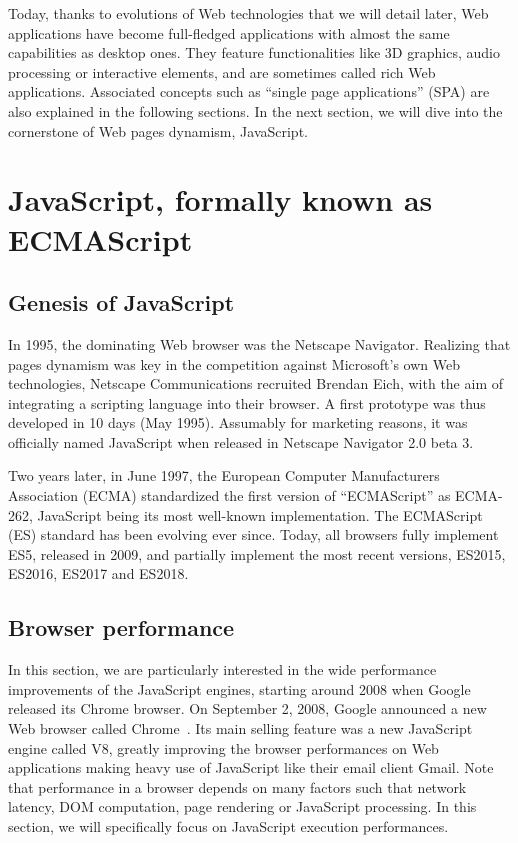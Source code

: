Today, thanks to evolutions of Web technologies that we will detail later,
Web applications have become full-fledged applications with almost
the same capabilities as desktop ones.
They feature functionalities like 3D graphics, audio processing or interactive elements,
and are sometimes called rich Web applications.
Associated concepts such as ``single page applications'' (SPA)
are also explained in the following sections.
In the next section, we will dive into the cornerstone of Web pages dynamism, JavaScript.


\section{JavaScript, formally known as ECMAScript}%
\label{sec:javascript_formally_known_as_ecmascript}

\subsection{Genesis of JavaScript}%
\label{sub:genesis_of_javascript}

In 1995, the dominating Web browser was the Netscape Navigator.
Realizing that pages dynamism was key in the competition against Microsoft's
own Web technologies, Netscape Communications recruited Brendan Eich,
with the aim of integrating a scripting language into their browser.
A first prototype was thus developed in 10 days (May 1995).
Assumably for marketing reasons, it was officially named JavaScript
when released in Netscape Navigator 2.0 beta 3.

Two years later, in June 1997, the European Computer Manufacturers Association
(ECMA) standardized the first version of ``ECMAScript'' as ECMA-262,
JavaScript being its most well-known implementation.
The ECMAScript (ES) standard has been evolving ever since.
Today, all browsers fully implement ES5, released in 2009,
and partially implement the most recent versions, ES2015,
ES2016, ES2017 and ES2018.

\subsection{Browser performance}%
\label{sub:browser_performance}

In this section, we are particularly interested
in the wide performance improvements of the JavaScript engines,
starting around 2008 when Google released its Chrome browser.
On September 2, 2008, Google announced a new Web browser called Chrome~\cite{google-chrome}.
Its main selling feature was a new JavaScript engine called V8,
greatly improving the browser performances on Web applications making
heavy use of JavaScript like their email client Gmail.
Note that performance in a browser depends on many factors
such that network latency, DOM computation, page rendering or JavaScript processing.
In this section, we will specifically focus on JavaScript execution performances.

